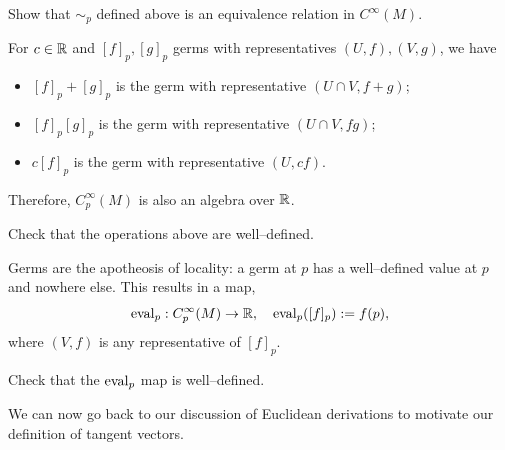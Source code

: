 \begin{exercise}
	Show that $\sim_p$ defined above is an equivalence relation in $C^\infty(M)$.
\end{exercise}

For $c\in\mathbb{R}$ and $[f]_p, [g]_p$ germs with representatives $(U, f), (V, g)$, we have
\begin{itemize}
	\item $[f]_p + [g]_p$ is the germ with representative $(U\cap V, f+g)$;
	\item $[f]_p [g]_p$ is the germ with representative $(U\cap V, f g)$;
	\item $c[f]_p$ is the germ with representative $(U, cf)$.
\end{itemize}
Therefore, $C_p^\infty(M)$ is also an algebra over $\mathbb{R}$.

\begin{exercise}
	Check that the operations above are well--defined.
\end{exercise}

Germs are the apotheosis of locality: a germ at $p$ has a well--defined value at $p$ and nowhere else.
This results in a map,
\begin{equation}
	\operatorname{eval}_p: C_p^\infty(M) \to \mathbb{R}, \quad
	\operatorname{eval}_p([f]_p) := f(p),
\end{equation}
where $(V,f)$ is any representative of $[f]_p$.
\begin{exercise}
	Check that the $\operatorname{eval}_p$ map is well--defined.
\end{exercise}

We can now go back to our discussion of Euclidean derivations to motivate our definition of tangent vectors.

